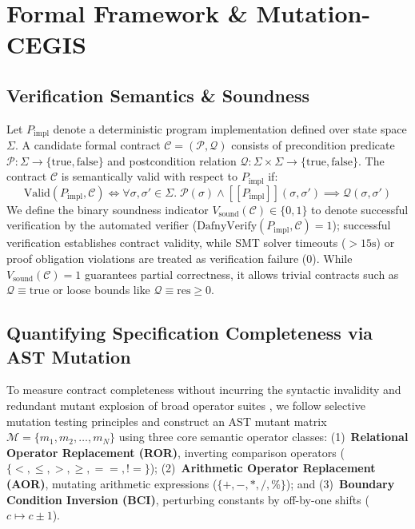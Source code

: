 \documentclass{article}
\providecommand{\llbracket}{[\![}
\providecommand{\rrbracket}{]\!]}
\begin{document}
\section{Formal Framework \& Mutation-CEGIS}
\label{sec:framework}

\subsection{Verification Semantics \& Soundness}

Let $P_{\text{impl}}$ denote a deterministic program implementation defined over state space $\Sigma$. A candidate formal contract $\mathcal{C} = (\mathcal{P}, \mathcal{Q})$ consists of precondition predicate $\mathcal{P}: \Sigma \to \{\text{true}, \text{false}\}$ and postcondition relation $\mathcal{Q}: \Sigma \times \Sigma \to \{\text{true}, \text{false}\}$. The contract $\mathcal{C}$ is semantically valid with respect to $P_{\text{impl}}$ if:
\begin{equation}
\text{Valid}(P_{\text{impl}}, \mathcal{C}) \iff \forall \sigma, \sigma' \in \Sigma. \; \mathcal{P}(\sigma) \land \llbracket P_{\text{impl}} \rrbracket(\sigma, \sigma') \implies \mathcal{Q}(\sigma, \sigma')
\end{equation}
We define the binary soundness indicator $V_{\text{sound}}(\mathcal{C}) \in \{0, 1\}$ to denote successful verification by the automated verifier ($\text{DafnyVerify}(P_{\text{impl}}, \mathcal{C}) = 1$); successful verification establishes contract validity, while SMT solver timeouts ($>15\text{s}$) or proof obligation violations are treated as verification failure ($0$). While $V_{\text{sound}}(\mathcal{C}) = 1$ guarantees partial correctness, it allows trivial contracts such as $\mathcal{Q} \equiv \text{true}$ or loose bounds like $\mathcal{Q} \equiv \text{res} \ge 0$.

\subsection{Quantifying Specification Completeness via AST Mutation}

To measure contract completeness without incurring the syntactic invalidity and redundant mutant explosion of broad operator suites \citep{demillo1978mutation, offutt1996experimental, just2014mutants}, we follow selective mutation testing principles \citep{offutt1996experimental} and construct an AST mutant matrix $\mathcal{M} = \{m_1, m_2, \dots, m_N\}$ using three core semantic operator classes: (1)~\textbf{Relational Operator Replacement (ROR)}, inverting comparison operators ($\{<, \le, >, \ge, ==, !=\}$); (2)~\textbf{Arithmetic Operator Replacement (AOR)}, mutating arithmetic expressions ($\{+, -, *, /, \%\}$); and (3)~\textbf{Boundary Condition Inversion (BCI)}, perturbing constants by off-by-one shifts ($c \mapsto c \pm 1$).
\end{document}
